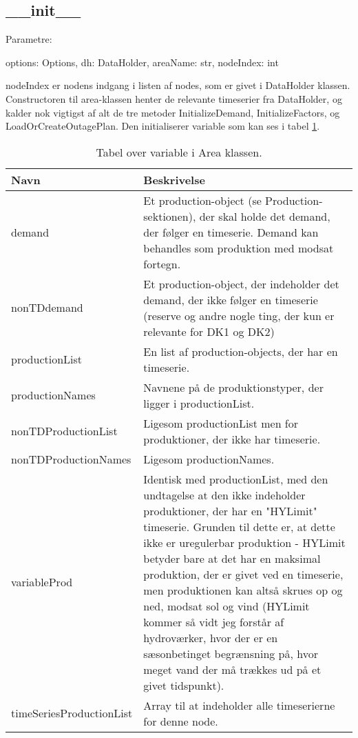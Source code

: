 \documentclass{article}
\begin{document}
\subsection{\_\_init\_\_}
Parametre: 
\begin{spverbatim}
    options: Options, dh: DataHolder, areaName: str, nodeIndex: int
\end{spverbatim}
nodeIndex er nodens indgang i listen af nodes, som er givet i DataHolder klassen. Constructoren til area-klassen henter de relevante timeserier fra DataHolder, og kalder nok vigtigst af alt de tre metoder InitializeDemand, InitializeFactors, og LoadOrCreateOutagePlan. Den initialiserer variable som kan ses i tabel \ref{tab:arraysArea}.
\begin{table}
\centering
    \begin{tabularx}{\textwidth}{lX}
    \toprule
    Navn     & Beskrivelse \\
    \midrule
    demand & Et production-object (se Production-sektionen), der skal holde det demand, der følger en timeserie. Demand kan behandles som produktion med modsat fortegn. \\
    nonTDdemand & Et production-object, der indeholder det demand, der ikke følger en timeserie (reserve og andre nogle ting, der kun er relevante for DK1 og DK2) \\
    productionList & En list af production-objects, der har en timeserie. \\
    productionNames & Navnene på de produktionstyper, der ligger i productionList. \\
    nonTDProductionList & Ligesom productionList men for produktioner, der ikke har timeserie.\\
    nonTDProductionNames & Ligesom productionNames.\\
    variableProd & Identisk med productionList, med den undtagelse at den ikke indeholder produktioner, der har en "HYLimit" timeserie. Grunden til dette er, at dette ikke er uregulerbar produktion - HYLimit betyder bare at det har en maksimal produktion, der er givet ved en timeserie, men produktionen kan altså skrues op og ned, modsat sol og vind (HYLimit kommer så vidt jeg forstår af hydroværker, hvor der er en sæsonbetinget begrænsning på, hvor meget vand der må trækkes ud på et givet tidspunkt). \\
    timeSeriesProductionList & Array til at indeholder alle timeserierne for denne node.\\
    \bottomrule
    \end{tabularx}%
  \label{tab:arraysArea}%
  \caption{Tabel over variable i Area klassen.}
\end{table}%
\end{document}
